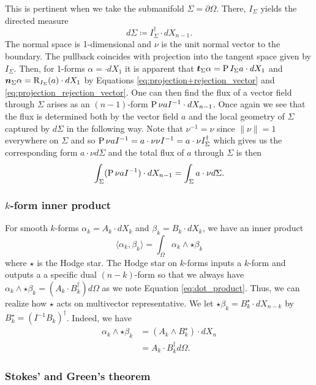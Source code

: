 This is pertinent when we take the submanifold $\Sigma = \partial \Omega$. There, $I_\Sigma$ yields the directed measure
\[
d\Sigma \coloneqq I_\Sigma^\dagger \cdot dX_{n-1}.
\]
The normal space is 1-dimensional and $\nu$ is the unit normal vector to the boundary. The pullback coincides with projection into the tangent space given by $I_\Sigma$.  Then, for 1-forms $\alpha = \cdot dX_1$ it is apparent that $\boldsymbol{t}_\Sigma \alpha = \operatorname{P}{I_\Sigma}{a} \cdot dX_1$ and $\boldsymbol{n}_\Sigma \alpha = \operatorname{R}_{I_\Sigma}(a) \cdot dX_1$ by Equations \ref{eq:projection+rejection_vector} and \ref{eq:projection_rejection_vector}. One can then find the flux of a vector field through $\Sigma$ arises as an $(n-1)$-form $\operatorname{P}{\nu}{a} I^{-1} \cdot dX_{n-1}$. Once again we see that the flux is determined both by the vector field $a$ and the local geometry of $\Sigma$ captured by $d\Sigma$ in the following way. Note that  $\nu^{-1}=\nu$ since $\|\nu\|=1$ everywhere on $\Sigma$ and so $\operatorname{P}{\nu}{a} I^{-1}= a \cdot \nu \nu I^{-1} = a \cdot \nu I_\Sigma^\dagger$ which gives us the corresponding form $a \cdot \nu d\Sigma$ and the total flux of $a$ through $\Sigma$ is then
\[
\int_\Sigma (\operatorname{P}{\nu}{a} I^{-1}) \cdot dX_{n-1} = \int_\Sigma a \cdot \nu d\Sigma.
\]

\subsubsection{$k$-form inner product}
For smooth $k$-forms $\alpha_k = A_k \cdot dX_k$ and $\beta_k = B_k \cdot dX_k$, we have an inner product 
\[
\langle \alpha_k, \beta_k \rangle = \int_\Omega \alpha_k \wedge \star \beta_k 
\]
where $\star$ is the Hodge star. The Hodge star on $k$-forms inputs a $k$-form and outputs a a specific dual $(n-k)$-form so that we always have $\alpha_k \wedge \star \beta_k  = (A_k\cdot B_k^\dagger)d\Omega$ as we note Equation \ref{eq:dot_product}. Thus, we can realize how $\star$ acts on multivector representative. We let $\star \beta_k = B_k^\star \cdot dX_{n-k}$ by $B_k^\star = (I^{-1} B_k)^\dagger$.  Indeed, we have
\begin{align*}
    \alpha_k \wedge \star \beta_k &= (A_k \wedge B_k^\star) \cdot dX_n\\
    &= A_k \cdot B_k^\dagger d\Omega.
\end{align*}

\subsubsection{Stokes' and Green's theorem}

